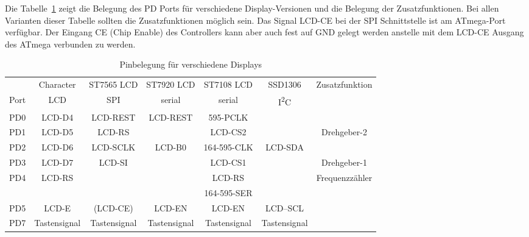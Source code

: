 Die Tabelle~\ref{tab:display-con} zeigt die Belegung des PD Ports für verschiedene Display-Versionen
und die Belegung der Zusatzfunktionen.
Bei allen Varianten dieser Tabelle sollten die Zusatzfunktionen möglich sein.
Das Signal LCD-CE bei der SPI Schnittstelle ist am ATmega-Port verfügbar. Der Eingang CE (Chip Enable) des
Controllers kann aber auch fest auf GND gelegt werden anstelle mit dem LCD-CE Ausgang des ATmega verbunden zu werden.

\begin{table}[H]
  \begin{center}
    \begin{tabular}{| c || c | c | c | c | c | c |}
    \hline
           & Character     & ST7565 LCD & ST7920 LCD     & ST7108 LCD  & SSD1306     & Zusatzfunktion \\
      Port & LCD           &   SPI      & serial         & serial      &   I\textsuperscript{2}C      & \\
    \hline
    \hline
    PD0    &  LCD-D4       &  LCD-REST  & LCD-REST       & 595-PCLK        &            & \\
    \hline
    PD1    &  LCD-D5       &  LCD-RS    &                & LCD-CS2     &             & Drehgeber-2 \\
    \hline
    PD2    &  LCD-D6       &  LCD-SCLK  & LCD-B0         & 164-595-CLK &  LCD-SDA    & \\
    \hline
    PD3    &  LCD-D7       &  LCD-SI    &                & LCD-CS1     &             & Drehgeber-1 \\
    \hline
    PD4    &  LCD-RS       &            &                & LCD-RS      &             & Frequenzzähler \\
           &               &            &                & 164-595-SER &             &                \\
    \hline
    PD5    &  LCD-E        &  (LCD-CE)  & LCD-EN         & LCD-EN      &   LCD--SCL  & \\
    \hline
    PD7    & Tastensignal & Tastensignal & Tastensignal  & Tastensignal & Tastensignal & \\
    \hline
    \end{tabular}
  \end{center}
  \caption{Pinbelegung für verschiedene Displays}
  \label{tab:display-con}
\end{table}

